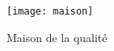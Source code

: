 

\begin{figure}[htp]
	\centering
	\caption{Maison de la qualité}
	\label{f:cdc_maison}
	\texttt{[image: maison]}
\end{figure}